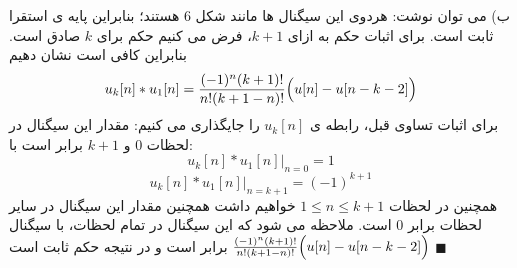 \documentclass[10pt,letterpaper]{article}
\begin{document}
ب) می توان نوشت:
هردوی این سیگنال ها مانند شکل 6 هستند؛ بنابراین پایه ی استقرا ثابت است.
برای اثبات حکم به ازای $k+1$، فرض می کنیم  حکم برای $k$ صادق است. بنابراین کافی است نشان دهیم
$$
u_k[n]*u_1[n]={(-1)^n (k+1)!\over n! (k+1-n)!}\Big(u[n]-u[n-k-2]\Big)
$$
برای اثبات تساوی قبل، رابطه ی $u_k[n]$ را جایگذاری می کنیم:
مقدار این سیگنال در لحظات $0$ و $k+1$ برابر است با:
$$
u_k[n]*u_1[n]\Big|_{n=0}=1
$$
$$
u_k[n]*u_1[n]\Big|_{n=k+1}={(-1)^{k+1}}
$$
همچنین در لحظات 
$
1\le n\le k+1
$
 خواهیم داشت
همچنین مقدار این سیگنال در سایر لحظات برابر 0 است. ملاحظه می شود که این سیگنال در تمام لحظات، با سیگنال ${(-1)^n (k+1)!\over n! (k+1-n)!}\Big(u[n]-u[n-k-2]\Big)$ برابر است و در نتیجه حکم ثابت است 
$
\blacksquare
$
\end{document}
